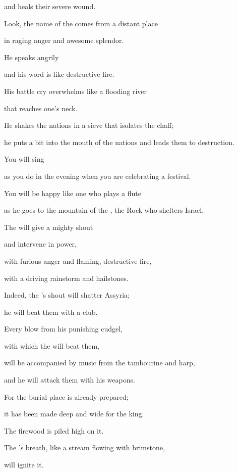{\par }{\Q and heals
their severe wound.
\par }{\Q {}Look,
the name
of the {}
comes
from a distant place
\par }{\Q in raging
anger
and awesome
splendor.
\par }{\Q He speaks
angrily
\par }{\Q and his word
is like destructive
fire.
\par }{\Q {}His battle cry
overwhelms like a flooding
river
\par }{\Q that reaches
one’s neck.
\par }{\Q He shakes
the nations
in a sieve
that isolates
the chaff;
\par }{\Q he puts a bit
into
the mouth
of the nations
and leads
them to destruction.
\par }{\Q {}You will sing
\par }{\Q as you do in the evening
when
you are celebrating
a festival.
\par }{\Q You will be happy
like one who plays
a flute
\par }{\Q as he goes
to
the mountain
of the {}, the Rock
who shelters Israel.
\par }{\Q {}The
{}
will give a mighty
shout
\par }{\Q and intervene
in power,
\par }{\Q with furious
anger
and flaming,
destructive
fire,
\par }{\Q with a driving
rainstorm
and hailstones.
\par }{\Q {}Indeed,
the
{}’s
shout
will shatter
Assyria;
\par }{\Q he will beat
them with a club.
\par }{\Q {}Every
blow
from his punishing
cudgel,
\par }{\Q with which
the {}
will beat
them,

\par }{\Q will be accompanied by music from
the tambourine
and harp,
\par }{\Q and he will attack
them with his weapons.
\par }{\Q {}For
the burial place
is already prepared;
\par }{\Q it has been made
deep
and wide
for the king.
\par }{\Q The firewood
is piled
high
on it.

\par }{\Q The
{}’s
breath,
like a stream
flowing with brimstone,
\par }{\Q will ignite it.

}
